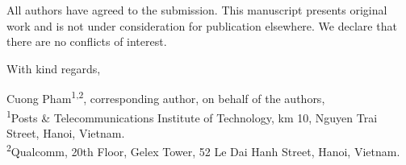 \documentclass[12pt,a4paper]{article}
\begin{document}
All authors have agreed to the submission. This manuscript presents original work and is not under consideration for publication elsewhere. We declare that there are no conflicts of interest.

With kind regards,

Cuong Pham\textsuperscript{1,2}, corresponding author, on behalf of the authors,\\
\textsuperscript{1}Posts \& Telecommunications Institute of Technology, km 10, Nguyen Trai Street, Hanoi, Vietnam.\\
\textsuperscript{2}Qualcomm, 20th Floor, Gelex Tower, 52 Le Dai Hanh Street, Hanoi, Vietnam.
\end{document}
